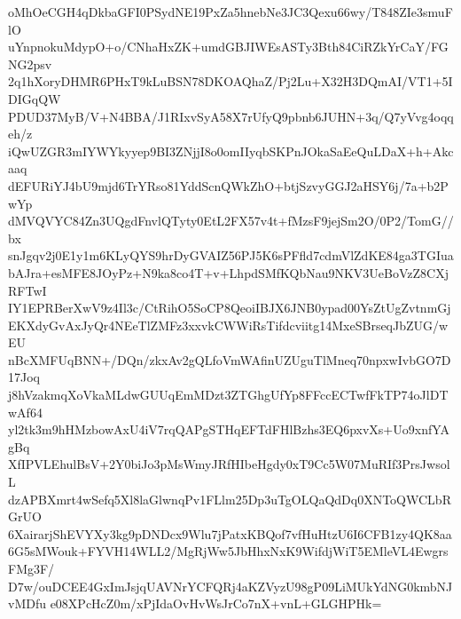 oMhOeCGH4qDkbaGFI0PSydNE19PxZa5hnebNe3JC3Qexu66wy/T848ZIe3smuFlO
uYnpnokuMdypO+o/CNhaHxZK+umdGBJIWEsASTy3Bth84CiRZkYrCaY/FGNG2psv
2q1hXoryDHMR6PHxT9kLuBSN78DKOAQhaZ/Pj2Lu+X32H3DQmAI/VT1+5IDIGqQW
PDUD37MyB/V+N4BBA/J1RIxvSyA58X7rUfyQ9pbnb6JUHN+3q/Q7yVvg4oqqeh/z
iQwUZGR3mIYWYkyyep9BI3ZNjjI8o0omIIyqbSKPnJOkaSaEeQuLDaX+h+Akcaaq
dEFURiYJ4bU9mjd6TrYRso81YddScnQWkZhO+btjSzvyGGJ2aHSY6j/7a+b2PwYp
dMVQVYC84Zn3UQgdFnvlQTyty0EtL2FX57v4t+fMzsF9jejSm2O/0P2/TomG//bx
snJgqv2j0E1y1m6KLyQYS9hrDyGVAIZ56PJ5K6sPFfld7cdmVlZdKE84ga3TGIua
bAJra+esMFE8JOyPz+N9ka8co4T+v+LhpdSMfKQbNau9NKV3UeBoVzZ8CXjRFTwI
IY1EPRBerXwV9z4Il3c/CtRihO5SoCP8QeoiIBJX6JNB0ypad00YsZtUgZvtnmGj
EKXdyGvAxJyQr4NEeTlZMFz3xxvkCWWiRsTifdcviitg14MxeSBrseqJbZUG/wEU
nBcXMFUqBNN+/DQn/zkxAv2gQLfoVmWAfinUZUguTlMneq70npxwIvbGO7D17Joq
j8hVzakmqXoVkaMLdwGUUqEmMDzt3ZTGhgUfYp8FFccECTwfFkTP74oJlDTwAf64
yl2tk3m9hHMzbowAxU4iV7rqQAPgSTHqEFTdFHlBzhs3EQ6pxvXs+Uo9xnfYAgBq
XfIPVLEhulBsV+2Y0biJo3pMsWmyJRfHIbeHgdy0xT9Cc5W07MuRIf3PrsJwsolL
dzAPBXmrt4wSefq5Xl8laGlwnqPv1FLlm25Dp3uTgOLQaQdDq0XNToQWCLbRGrUO
6XairarjShEVYXy3kg9pDNDcx9Wlu7jPatxKBQof7vfHuHtzU6I6CFB1zy4QK8aa
6G5sMWouk+FYVH14WLL2/MgRjWw5JbHhxNxK9WifdjWiT5EMleVL4EwgrsFMg3F/
D7w/ouDCEE4GxImJsjqUAVNrYCFQRj4aKZVyzU98gP09LiMUkYdNG0kmbNJvMDfu
e08XPcHcZ0m/xPjIdaOvHvWsJrCo7nX+vnL+GLGHPHk=
